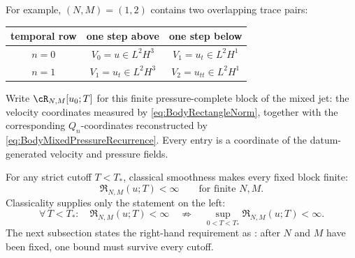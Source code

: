 For example, \((N,M)=(1,2)\) contains two overlapping trace pairs:
\begin{center}
\captionsetup{hypcap=false}
\label{tab:FirstAdjacentRectangle}
\renewcommand{\arraystretch}{1.35}
\begin{tabular}{@{}c c c@{}}
\toprule
temporal row & one step above & one step below \\
\midrule
\(n=0\) & \(V_0=u\in L^2H^3\) & \(V_1=u_t\in L^2H^1\) \\
\(n=1\) & \(V_1=u_t\in L^2H^3\) & \(V_2=u_{tt}\in L^2H^1\) \\
\bottomrule
\end{tabular}
\end{center}

Write \(\cR_{N,M}[u_0;T]\) for this finite pressure-complete block of the mixed jet:
the velocity coordinates measured by \eqref{eq:BodyRectangleNorm}, together with the
corresponding \(Q_n\)-coordinates reconstructed by
\eqref{eq:BodyMixedPressureRecurrence}.  Every entry is a coordinate of the
datum-generated velocity and pressure fields.

For any strict cutoff \(T<T_*\), classical smoothness makes every fixed block finite:
\begin{equation}\label{eq:StrictSubintervalRectangleBound}
  \mathfrak R_{N,M}(u;T)<\infty
  \qquad\text{for finite }N,M.
\end{equation}
Classicality supplies only the statement on the left:
\[
  \forall\,T<T_*:\quad \mathfrak R_{N,M}(u;T)<\infty
  \quad\not\Longrightarrow\quad
  \sup_{0<T<T_*}\mathfrak R_{N,M}(u;T)<\infty.
\]
The next subsection states the right-hand requirement as : after \(N\) and \(M\) have been fixed, one bound must survive every cutoff.
